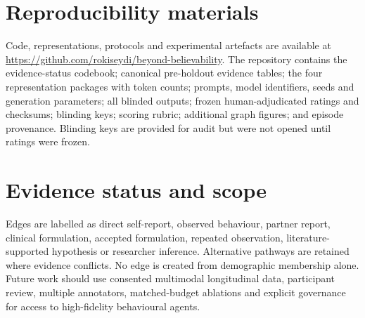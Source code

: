 \documentclass{article}
\begin{document}

\appendix

\section{Reproducibility materials}

Code, representations, protocols and experimental artefacts are available at
\url{https://github.com/rokiseydi/beyond-believability}.
The repository contains the evidence-status codebook; canonical pre-holdout evidence tables;
the four representation packages with token counts; prompts, model identifiers, seeds and
generation parameters; all blinded outputs; frozen human-adjudicated ratings and checksums;
blinding keys; scoring rubric; additional graph figures; and episode provenance. Blinding keys
are provided for audit but were not opened until ratings were frozen.

\section{Evidence status and scope}

Edges are labelled as direct self-report, observed behaviour, partner report, clinical formulation,
accepted formulation, repeated observation, literature-supported hypothesis or researcher
inference. Alternative pathways are retained where evidence conflicts. No edge is created from
demographic membership alone. Future work should use consented multimodal longitudinal data,
participant review, multiple annotators, matched-budget ablations and explicit governance for
access to high-fidelity behavioural agents.
\end{document}

